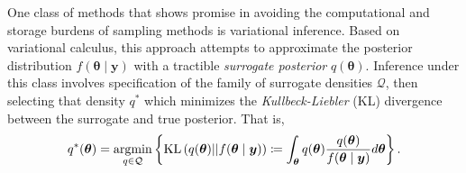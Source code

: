 

One class of methods that shows promise in avoiding the computational and storage
    burdens of sampling methods is variational inference.  Based on variational
    calculus, this approach attempts to approximate the posterior distribution
    $f(\bm{\theta}\mid\bm{y})$ with a tractible \emph{surrogate posterior} 
    $q(\bm{\theta})$.  Inference under this class involves specification of the
    family of surrogate densities $\mathcal{Q}$, then selecting that density 
    $q^*$ which minimizes the \emph{Kullbeck-Liebler} (KL) divergence between 
    the surrogate and true posterior.  That is,
    \[
        q^*(\bm{\theta}) = \operatorname*{argmin}_{q\in\mathcal{Q}}\left\lbrace
        \text{KL}\left(q(\bm{\theta})||f(\bm{\theta}\mid\bm{y})\right) 
        \coloneqq
        \int_{\bm{\theta}}q(\bm{\theta})
            \frac{q(\bm{\theta})}{f(\bm{\theta}\mid\bm{y})}
            d\bm{\theta}
        \right\rbrace.
    \]
    











